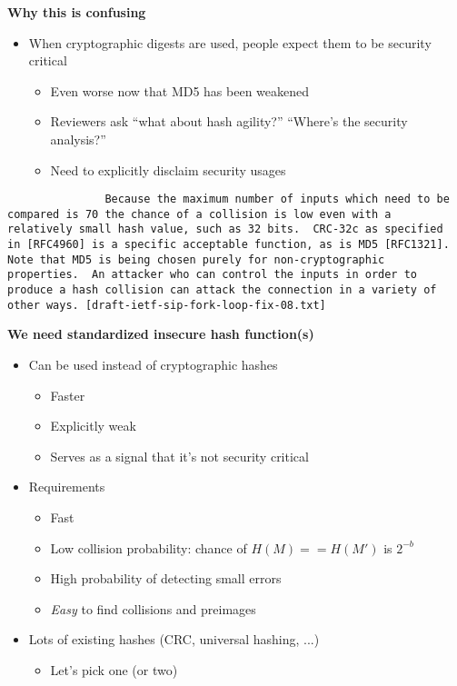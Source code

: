 \documentclass[helvetica]{seminar}
\newcommand{\heading}[1]{%
  \begin{center} 
    \large\bf 
    #1 
  \end{center} 
  \vspace{.4 in}}
\begin{document}
\begin{slide}
\heading{Why this is confusing}

\begin{itemize}
\item When cryptographic digests are used, people expect them to be security critical
\begin{itemize}
\item Even worse now that MD5 has been weakened
\item Reviewers ask ``what about hash agility?'' ``Where's the security analysis?''
\item Need to explicitly disclaim security usages
\end{itemize}
\end{itemize}
\footnotesize{
\begin{verbatim}
               Because the maximum number of inputs which need to be
compared is 70 the chance of a collision is low even with a
relatively small hash value, such as 32 bits.  CRC-32c as specified
in [RFC4960] is a specific acceptable function, as is MD5 [RFC1321].
Note that MD5 is being chosen purely for non-cryptographic
properties.  An attacker who can control the inputs in order to
produce a hash collision can attack the connection in a variety of
other ways. [draft-ietf-sip-fork-loop-fix-08.txt]
\end{verbatim}}
\end{slide}


\begin{slide}
\heading{We need standardized insecure hash function(s)}

\begin{itemize}
\item Can be used instead of cryptographic hashes
\begin{itemize}
\item Faster
\item Explicitly weak
\item Serves as a signal that it's not security critical
\end{itemize}
\item Requirements
\begin{itemize}
\item Fast
\item Low collision probability: chance of $H(M)==H(M')$ is $2^{-b}$
\item High probability of detecting small errors
\item \emph{Easy} to find collisions and preimages
\end{itemize}
\item Lots of existing hashes (CRC, universal hashing, ...)
\begin{itemize}
\item Let's pick one (or two)
\end{itemize}
\end{itemize}

\end{slide}


{\small


}
\end{document}

